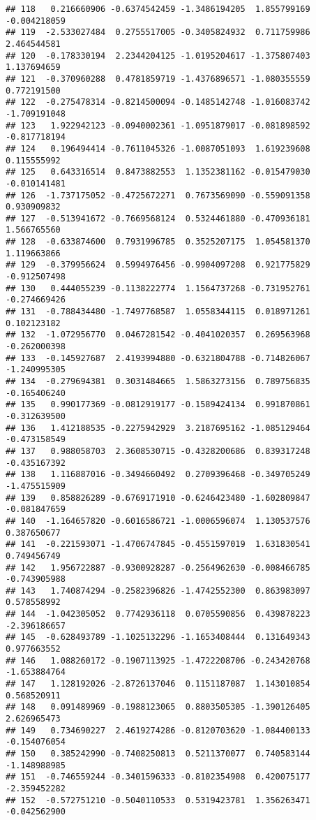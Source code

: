 \documentclass[
]{article}
\begin{document}
\begin{verbatim}
## 118   0.216660906 -0.6374542459 -1.3486194205  1.855799169 -0.004218059
## 119  -2.533027484  0.2755517005 -0.3405824932  0.711759986  2.464544581
## 120  -0.178330194  2.2344204125 -1.0195204617 -1.375807403  1.137694659
## 121  -0.370960288  0.4781859719 -1.4376896571 -1.080355559  0.772191500
## 122  -0.275478314 -0.8214500094 -0.1485142748 -1.016083742 -1.709191048
## 123   1.922942123 -0.0940002361 -1.0951879017 -0.081898592 -0.817718194
## 124   0.196494414 -0.7611045326 -1.0087051093  1.619239608  0.115555992
## 125   0.643316514  0.8473882553  1.1352381162 -0.015479030 -0.010141481
## 126  -1.737175052 -0.4725672271  0.7673569090 -0.559091358  0.930909832
## 127  -0.513941672 -0.7669568124  0.5324461880 -0.470936181  1.566765560
## 128  -0.633874600  0.7931996785  0.3525207175  1.054581370  1.119663866
## 129  -0.379956624  0.5994976456 -0.9904097208  0.921775829 -0.912507498
## 130   0.444055239 -0.1138222774  1.1564737268 -0.731952761 -0.274669426
## 131  -0.788434480 -1.7497768587  1.0558344115  0.018971261  0.102123182
## 132  -1.072956770  0.0467281542 -0.4041020357  0.269563968 -0.262000398
## 133  -0.145927687  2.4193994880 -0.6321804788 -0.714826067 -1.240995305
## 134  -0.279694381  0.3031484665  1.5863273156  0.789756835 -0.165406240
## 135   0.990177369 -0.0812919177 -0.1589424134  0.991870861 -0.312639500
## 136   1.412188535 -0.2275942929  3.2187695162 -1.085129464 -0.473158549
## 137   0.988058703  2.3608530715 -0.4328200686  0.839317248 -0.435167392
## 138   1.116887016 -0.3494660492  0.2709396468 -0.349705249 -1.475515909
## 139   0.858826289 -0.6769171910 -0.6246423480 -1.602809847 -0.081847659
## 140  -1.164657820 -0.6016586721 -1.0006596074  1.130537576  0.387650677
## 141  -0.221593071 -1.4706747845 -0.4551597019  1.631830541  0.749456749
## 142   1.956722887 -0.9300928287 -0.2564962630 -0.008466785 -0.743905988
## 143   1.740874294 -0.2582396826 -1.4742552300  0.863983097  0.578558992
## 144  -1.042305052  0.7742936118  0.0705590856  0.439878223 -2.396186657
## 145  -0.628493789 -1.1025132296 -1.1653408444  0.131649343  0.977663552
## 146   1.088260172 -0.1907113925 -1.4722208706 -0.243420768 -1.653884764
## 147   1.128192026 -2.8726137046  0.1151187087  1.143010854  0.568520911
## 148   0.091489969 -0.1988123065  0.8803505305 -1.390126405  2.626965473
## 149   0.734690227  2.4619274286 -0.8120703620 -1.084400133 -0.154076054
## 150   0.385242990 -0.7408250813  0.5211370077  0.740583144 -1.148988985
## 151  -0.746559244 -0.3401596333 -0.8102354908  0.420075177 -2.359452282
## 152  -0.572751210 -0.5040110533  0.5319423781  1.356263471 -0.042562900

\end{verbatim}
\end{document}
